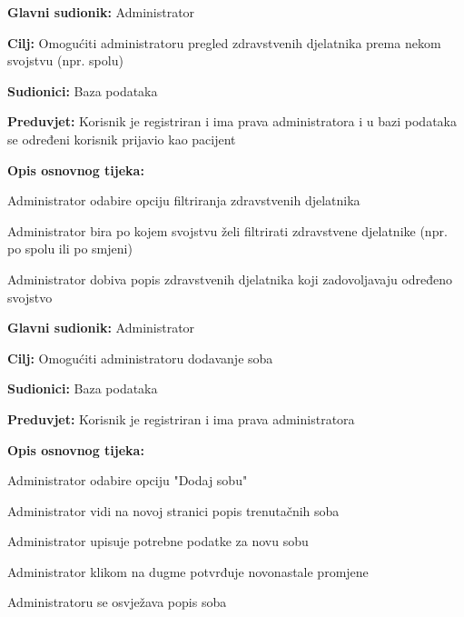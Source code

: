 \noindent {}
\begin{packed_item}
	
	\item \textbf{Glavni sudionik: }Administrator
	\item  \textbf{Cilj:} Omogućiti administratoru pregled zdravstvenih djelatnika prema nekom svojstvu (npr. spolu)
	\item  \textbf{Sudionici:} Baza podataka
	\item  \textbf{Preduvjet:} Korisnik je registriran i ima prava administratora i u bazi podataka se određeni korisnik prijavio kao pacijent
	\item  \textbf{Opis osnovnog tijeka:}
	
	\item[] \begin{packed_enum}
		
		\item Administrator odabire opciju filtriranja zdravstvenih djelatnika
		\item Administrator bira po kojem svojstvu želi filtrirati zdravstvene djelatnike (npr. po spolu ili po smjeni)
		\item Administrator dobiva popis zdravstvenih djelatnika koji zadovoljavaju određeno svojstvo
	\end{packed_enum}
	
\end{packed_item}

\noindent {}
\begin{packed_item}
	
	\item \textbf{Glavni sudionik: }Administrator
	\item  \textbf{Cilj:} Omogućiti administratoru dodavanje soba
	\item  \textbf{Sudionici:} Baza podataka
	\item  \textbf{Preduvjet:} Korisnik je registriran i ima prava administratora
	\item  \textbf{Opis osnovnog tijeka:}
	
	\item[] \begin{packed_enum}
		
		\item Administrator odabire opciju "Dodaj sobu"
		\item Administrator vidi na novoj stranici popis trenutačnih soba
		\item Administrator upisuje potrebne podatke za novu sobu
		\item Administrator klikom na dugme potvrđuje novonastale promjene
		\item Administratoru se osvježava popis soba
	\end{packed_enum}
	
\end{packed_item}

